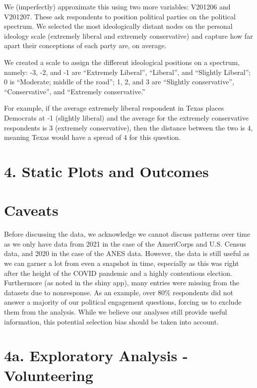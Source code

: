 \documentclass[
  letterpaper,
  DIV=11,
  numbers=noendperiod]{scrartcl}
\begin{document}
We (imperfectly) approximate this using two more variables: V201206 and
V201207. These ask respondents to position political parties on the
political spectrum. We selected the most ideologically distant nodes on
the personal ideology scale (extremely liberal and extremely
conservative) and capture how far apart their conceptions of each party
are, on average.

We created a scale to assign the different ideological positions on a
spectrum, namely: -3, -2, and -1 are ``Extremely Liberal'', ``Liberal'',
and ``Slightly Liberal''; 0 is ``Moderate; middle of the road''; 1, 2,
and 3 are ``Slightly conservative'', ``Conservative'', and ``Extremely
conservative.''

For example, if the average extremely liberal respondent in Texas places
Democrats at -1 (slightly liberal) and the average for the extremely
conservative respondents is 3 (extremely conservative), then the
distance between the two is 4, meaning Texas would have a spread of 4
for this question.

\section{4. Static Plots and Outcomes}\label{static-plots-and-outcomes}

\section{Caveats}\label{caveats}

Before discussing the data, we acknowledge we cannot discuss patterns
over time as we only have data from 2021 in the case of the AmeriCorps
and U.S. Census data, and 2020 in the case of the ANES data. However,
the data is still useful as we can garner a lot from even a snapshot in
time, especially as this was right after the height of the COVID
pandemic and a highly contentious election. Furthermore (as noted in the
shiny app), many entries were missing from the datasets due to
nonresponse. As an example, over 80\% respondents did not answer a
majority of our political engagement questions, forcing us to exclude
them from the analysis. While we believe our analyses still provide
useful information, this potential selection bias should be taken into
account.

\section{4a. Exploratory Analysis -
Volunteering}\label{a.-exploratory-analysis---volunteering}
\end{document}
